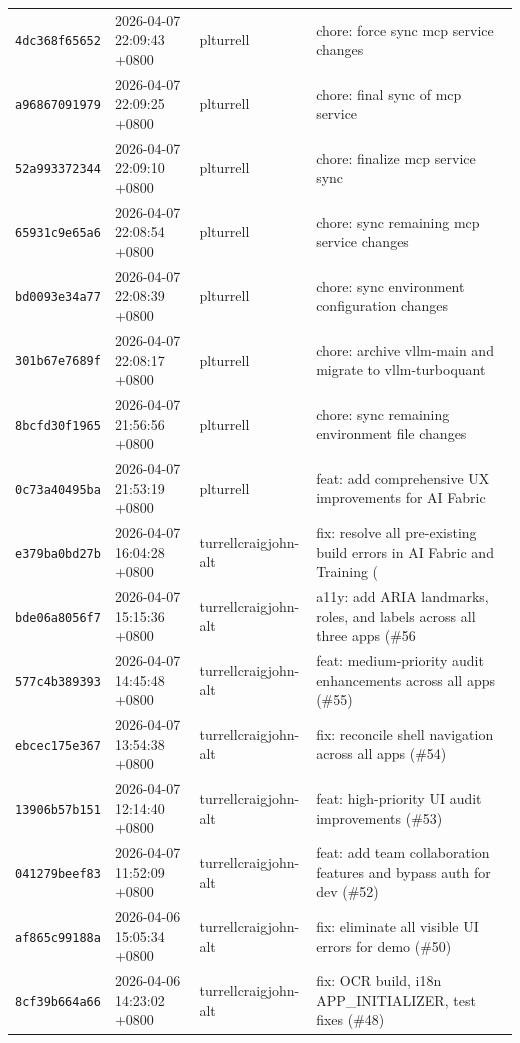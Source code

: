 \documentclass[11pt,a4paper]{article}
\begin{document}
\begin{longtable}{|p{2.2cm}|p{3.2cm}|l|p{6cm}|}
\texttt{4dc368f65652} & 2026-04-07 22:09:43 +0800 & plturrell & chore: force sync mcp service changes \\
\texttt{a96867091979} & 2026-04-07 22:09:25 +0800 & plturrell & chore: final sync of mcp service \\
\texttt{52a993372344} & 2026-04-07 22:09:10 +0800 & plturrell & chore: finalize mcp service sync \\
\texttt{65931c9e65a6} & 2026-04-07 22:08:54 +0800 & plturrell & chore: sync remaining mcp service changes \\
\texttt{bd0093e34a77} & 2026-04-07 22:08:39 +0800 & plturrell & chore: sync environment configuration changes \\
\texttt{301b67e7689f} & 2026-04-07 22:08:17 +0800 & plturrell & chore: archive vllm-main and migrate to vllm-turboquant \\
\texttt{8bcfd30f1965} & 2026-04-07 21:56:56 +0800 & plturrell & chore: sync remaining environment file changes \\
\texttt{0c73a40495ba} & 2026-04-07 21:53:19 +0800 & plturrell & feat: add comprehensive UX improvements for AI Fabric \\
\texttt{e379ba0bd27b} & 2026-04-07 16:04:28 +0800 & turrellcraigjohn-alt & fix: resolve all pre-existing build errors in AI Fabric and Training ( \\
\texttt{bde06a8056f7} & 2026-04-07 15:15:36 +0800 & turrellcraigjohn-alt & a11y: add ARIA landmarks, roles, and labels across all three apps (\#56 \\
\texttt{577c4b389393} & 2026-04-07 14:45:48 +0800 & turrellcraigjohn-alt & feat: medium-priority audit enhancements across all apps (\#55) \\
\texttt{ebcec175e367} & 2026-04-07 13:54:38 +0800 & turrellcraigjohn-alt & fix: reconcile shell navigation across all apps (\#54) \\
\texttt{13906b57b151} & 2026-04-07 12:14:40 +0800 & turrellcraigjohn-alt & feat: high-priority UI audit improvements (\#53) \\
\texttt{041279beef83} & 2026-04-07 11:52:09 +0800 & turrellcraigjohn-alt & feat: add team collaboration features and bypass auth for dev (\#52) \\
\texttt{af865c99188a} & 2026-04-06 15:05:34 +0800 & turrellcraigjohn-alt & fix: eliminate all visible UI errors for demo (\#50) \\
\texttt{8cf39b664a66} & 2026-04-06 14:23:02 +0800 & turrellcraigjohn-alt & fix: OCR build, i18n APP\_INITIALIZER, test fixes (\#48) \\

\end{longtable}
\end{document}
